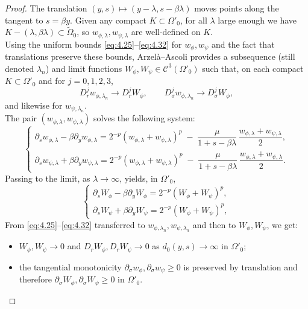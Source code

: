 \documentclass[
  sn-mathphys-num,
  colorlinks,
  linkcolor=darkmagenta,
  citecolor=rufous,
  urlcolor=zaffre,
  hypertexnames=false
]{sn-jnl}
\numberwithin{equation}{section}
\begin{document}
\begin{proof}
The translation $(y,s)\mapsto(y-\lambda, s-\beta\lambda)$ moves points along the tangent to $s=\beta y$.
Given any compact $K\subset\Omega'_0$, for all $\lambda$ large enough we have 
$K-(\lambda,\beta\lambda)\subset\tilde{\Omega}_0$,
so $w_{\phi,\lambda}, w_{\psi,\lambda}$ are well-defined on $K$.\\
Using the uniform bounds \eqref{eq:4.25}–\eqref{eq:4.32} for $w_{\phi},w_{\psi}$ and the fact that translations preserve these bounds, Arzelà–Ascoli provides a subsequence (still denoted $\lambda_n$) and limit functions $W_\phi,W_\psi\in \mathcal{C}^3(\Omega'_0)$ such that, on each compact $K\subset\Omega'_0$ and for $j=0,1,2,3$,
$$
D_r^j w_{\phi,\lambda_n} \to D_r^j W_\phi, 
\qquad 
D_\sigma^j w_{\phi,\lambda_n} \to D_\sigma^j W_\phi,
$$
and likewise for $w_{\psi,\lambda_n}$.\\
The pair $(w_{\phi,\lambda},w_{\psi,\lambda})$ solves the following system:
$$
\begin{cases}
\partial_s w_{\phi,\lambda} - \beta \partial_y w_{\phi,\lambda}
= 2^{-p}(w_{\phi,\lambda}+w_{\psi,\lambda})^p \;-\; \dfrac{\mu}{1+s-\beta\lambda}\,\dfrac{w_{\phi,\lambda}+w_{\psi,\lambda}}{2},\\[6pt]
\partial_s w_{\psi,\lambda} + \beta \partial_y w_{\psi,\lambda}
= 2^{-p}(w_{\phi,\lambda}+w_{\psi,\lambda})^p \;-\; \dfrac{\mu}{1+s-\beta\lambda}\,\dfrac{w_{\phi,\lambda}+w_{\psi,\lambda}}{2}.
\end{cases}
$$
Passing to the limit, as $\lambda \to \infty$, yields, in $\Omega'_0$,
\begin{equation}\label{7.9}
\begin{cases}
\partial_s W_\phi - \beta \partial_y W_\phi = 2^{-p}(W_\phi + W_\psi)^p, \\
\partial_s W_\psi + \beta \partial_y W_\psi = 2^{-p}(W_\phi + W_\psi)^p,
\end{cases}
\end{equation}
From \eqref{eq:4.25}--\eqref{eq:4.32} transferred to $w_{\phi,\lambda_n},w_{\psi,\lambda_n}$ and then to $W_\phi,W_\psi$, we get:
\begin{itemize}
\item $W_\phi, W_\psi \to 0$ and $D_r W_\phi, D_r W_\psi \to 0$ as $d_0(y,s)\to\infty$ in $\Omega'_0$;
\item the tangential monotonicity $\partial_\sigma w_\phi,\partial_\sigma w_\psi \ge 0$  is preserved by translation and therefore  $\partial_\sigma W_\phi,\partial_\sigma W_\psi \ge 0$ in $\Omega'_0$.

\end{itemize}
\end{proof}
\end{document}
